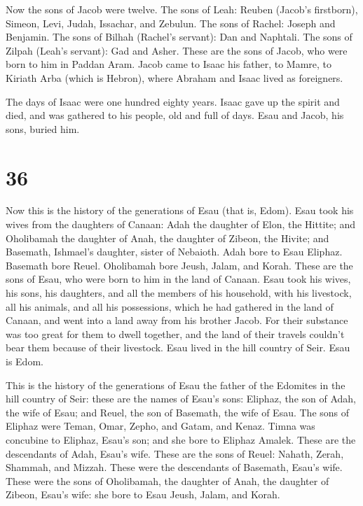 Now the sons of Jacob were twelve.  The sons of Leah:
Reuben (Jacob's firstborn), Simeon, Levi, Judah, Issachar, and Zebulun.
 The sons of Rachel: Joseph and Benjamin.  The
sons of Bilhah (Rachel's servant): Dan and Naphtali.  The
sons of Zilpah (Leah's servant): Gad and Asher. These are the sons of
Jacob, who were born to him in Paddan Aram.  Jacob came to
Isaac his father, to Mamre, to Kiriath Arba (which is Hebron), where
Abraham and Isaac lived as foreigners.

 The days of Isaac were one hundred eighty years.
 Isaac gave up the spirit and died, and was gathered to his
people, old and full of days. Esau and Jacob, his sons, buried him.

\hypertarget{section-35}{%
\section{36}\label{section-35}}

 Now this is the history of the generations of Esau (that
is, Edom).  Esau took his wives from the daughters of
Canaan: Adah the daughter of Elon, the Hittite; and Oholibamah the
daughter of Anah, the daughter of Zibeon, the Hivite;  and
Basemath, Ishmael's daughter, sister of Nebaioth.  Adah bore
to Esau Eliphaz. Basemath bore Reuel.  Oholibamah bore
Jeush, Jalam, and Korah. These are the sons of Esau, who were born to
him in the land of Canaan.  Esau took his wives, his sons,
his daughters, and all the members of his household, with his livestock,
all his animals, and all his possessions, which he had gathered in the
land of Canaan, and went into a land away from his brother Jacob.
 For their substance was too great for them to dwell
together, and the land of their travels couldn't bear them because of
their livestock.  Esau lived in the hill country of Seir.
Esau is Edom.

 This is the history of the generations of Esau the father
of the Edomites in the hill country of Seir:  these are the
names of Esau's sons: Eliphaz, the son of Adah, the wife of Esau; and
Reuel, the son of Basemath, the wife of Esau.  The sons of
Eliphaz were Teman, Omar, Zepho, and Gatam, and Kenaz. 
Timna was concubine to Eliphaz, Esau's son; and she bore to Eliphaz
Amalek. These are the descendants of Adah, Esau's wife. 
These are the sons of Reuel: Nahath, Zerah, Shammah, and Mizzah. These
were the descendants of Basemath, Esau's wife.  These were
the sons of Oholibamah, the daughter of Anah, the daughter of Zibeon,
Esau's wife: she bore to Esau Jeush, Jalam, and Korah.

